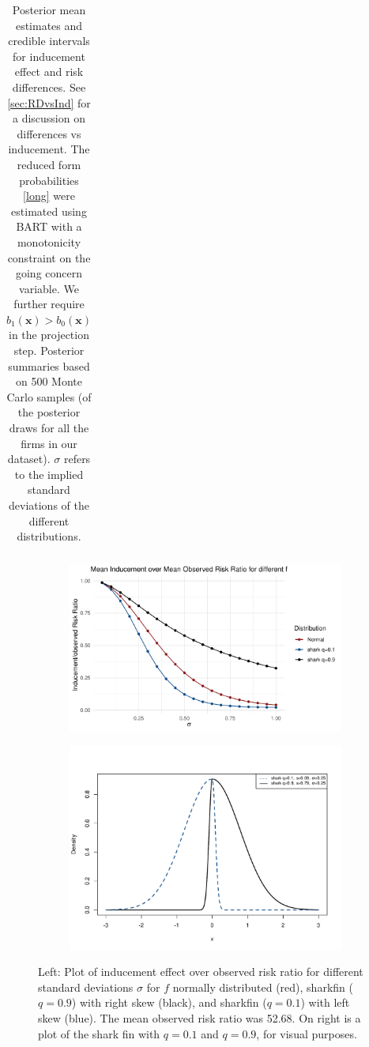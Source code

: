 \documentclass[aoas,preprint, 11pt, dvipsnames, table, x11name]{imsart}
\renewcommand{\bm}[1]{\mathbf{#1}}
\theoremstyle{remark}
\begin{document}
\begin{table}[t]
{\begin{tabular}{lP{1.9cm}P{2.9cm}P{2.7cm}P{3.1cm}}
			
		\end{tabular}
	}
		\caption{Posterior mean estimates and credible intervals for inducement effect and risk differences. See \autoref{sec:RDvsInd} for a discussion on differences vs inducement.  The reduced form probabilities \autoref{long} were estimated using BART with a monotonicity constraint on the going concern variable.  We further require $b_1(\bm{x})>b_0(\bm{x})$ in the projection step. Posterior summaries based on 500 Monte Carlo samples (of the posterior draws for all the firms in our dataset). $\sigma$ refers to the implied standard deviations of the different distributions. }
		\label{resultssummary_rr}
	\end{table}
	\color{black}
	
	\begin{figure}[!httb]
		\centering 
		\begin{subfigure}{.5\textwidth}
			\includegraphics[width=7.cm]{induceoverrisk_newvar}
		\end{subfigure}%
		\begin{subfigure}{.5\textwidth}
			\includegraphics[width=7.cm]{diff_shark_plots}
		\end{subfigure}
		\caption{Left: Plot of inducement effect over observed risk ratio for different standard deviations $\sigma$ for $f$ normally distributed (red), sharkfin ($q=0.9$) with right skew (black), and sharkfin ($q=0.1$) with left skew (blue). The mean observed risk ratio was 52.68. On right is a plot of the shark fin with $q=0.1$ and $q=0.9$, for visual purposes. }%
		\label{f_explain_plots}
	\end{figure}
	
\end{document}
